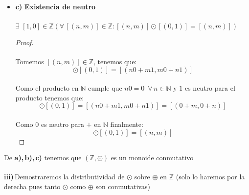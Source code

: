 \documentclass[11pt,letterpaper]{article}
\newcommand{\N}{\mathbb{N}}
\newcommand{\Z}{\mathbb{Z}}
\begin{document}
\begin{itemize}
\begin{proof}
\begin{equation*}
            [(n,m)]\odot(\,[(r,s)\odot[(t,u)]]\,)=[((nr)t+(ns)u+(ms)t+(mr)u,(mr)t+(ms)u+(ns)t)+(nr)u)]
        \end{equation*}\,\\
        Aplicando de nuevo la distributividad del producto sobre la suma de $\N$\,\\
        \begin{align*}
            [(n,m)]\odot(\,[(r,s)\odot[(t,u)]]\,)=[(t(nr+ms)+u(ns+mr),t(mr+ns)+u(ms+nr)u+)]\\
            =[(nr+ms,ns+mr)]\odot[(t,u)]\\
            =(\,[(n,m)]\odot[(r,s)]\,)\odot[(t,u)]\,)
        \end{align*}\,\\
    \end{proof}
    \item\textbf{c)\,\,Existencia de neutro}\,\\
    \,\\
    $\exists\,\,[1,0]\in \Z(\forall\,[(n,m)]\in \Z:[(n,m)]\odot[(0,1)]=[(n,m)])$
    \begin{proof}\,\\
        \,\\
        Tomemos $[(n,m)]\in \Z$, tenemos que:\,\\
        \begin{equation*}
            [(n,m)]\odot[(0,1)]=[(n0+m1,m0+n1)]
        \end{equation*}\,\\
        Como el producto en $\N$ cumple que $n0=0\,\,\,\forall\,n\in \N$ y $1$ es neutro para el producto tenemos que:\,\\
        \begin{equation*}
            [(n,m)]\odot[(0,1)]=[(n0+m1,m0+n1)]=[(0+m,0+n)]
        \end{equation*}\,\\
        Como $0$ es neutro para $+$ en $\N$ finalmente:\,\\
        \begin{equation*}
            [(n,m)]\odot[(0,1)]=[(n,m)]
        \end{equation*}        
    \end{proof}
    \end{itemize}
    De \textbf{a),\,b),\,c)} tenemos que $(\Z,\odot)$ es un monoide conmutativo\,\\
    \,\\
    \textbf{iii)}\,Demostraremos la distributividad de $\odot$ sobre $\oplus$ en $\Z$ (solo lo haremos por la derecha pues tanto $\odot$ como $\oplus$ son conmutativas)\,\\
\end{document}

